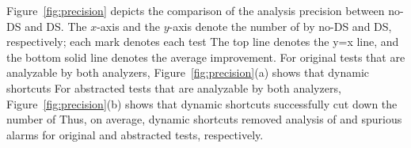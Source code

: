 Figure~\ref{fig:precision} depicts the comparison of the analysis
precision between no-DS and DS.  The $x$-axis and the $y$-axis denote
the number of  by no-DS and DS, respectively;
each  mark denotes each test  The top line
denotes the y=x line, and
the bottom solid line denotes the average improvement.
For  original tests that are analyzable by both analyzers,
Figure~\ref{fig:precision}(a) shows that dynamic shortcuts
For  abstracted tests that are analyzable by both analyzers,
Figure~\ref{fig:precision}(b) shows that dynamic shortcuts successfully cut down
the number of 
Thus, on average, dynamic shortcuts removed analysis of  and  spurious alarms
for original and abstracted tests, respectively.
